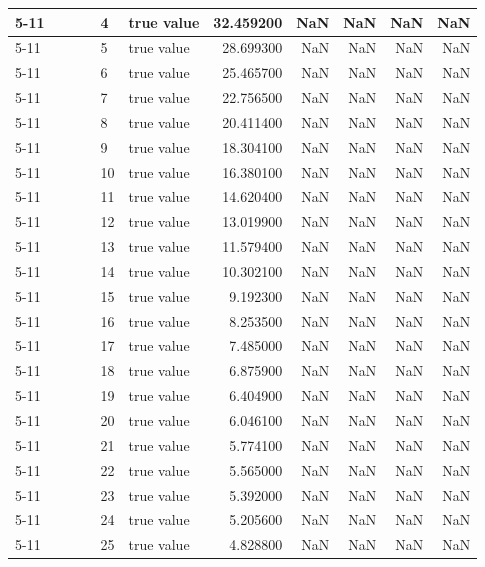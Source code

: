 \begin{tabular}{llllllrrrrr}
\cline{5-11}
 &  &  &  & 4 & true value & 32.459200 & NaN & NaN & NaN & NaN \\
\cline{5-11}
 &  &  &  & 5 & true value & 28.699300 & NaN & NaN & NaN & NaN \\
\cline{5-11}
 &  &  &  & 6 & true value & 25.465700 & NaN & NaN & NaN & NaN \\
\cline{5-11}
 &  &  &  & 7 & true value & 22.756500 & NaN & NaN & NaN & NaN \\
\cline{5-11}
 &  &  &  & 8 & true value & 20.411400 & NaN & NaN & NaN & NaN \\
\cline{5-11}
 &  &  &  & 9 & true value & 18.304100 & NaN & NaN & NaN & NaN \\
\cline{5-11}
 &  &  &  & 10 & true value & 16.380100 & NaN & NaN & NaN & NaN \\
\cline{5-11}
 &  &  &  & 11 & true value & 14.620400 & NaN & NaN & NaN & NaN \\
\cline{5-11}
 &  &  &  & 12 & true value & 13.019900 & NaN & NaN & NaN & NaN \\
\cline{5-11}
 &  &  &  & 13 & true value & 11.579400 & NaN & NaN & NaN & NaN \\
\cline{5-11}
 &  &  &  & 14 & true value & 10.302100 & NaN & NaN & NaN & NaN \\
\cline{5-11}
 &  &  &  & 15 & true value & 9.192300 & NaN & NaN & NaN & NaN \\
\cline{5-11}
 &  &  &  & 16 & true value & 8.253500 & NaN & NaN & NaN & NaN \\
\cline{5-11}
 &  &  &  & 17 & true value & 7.485000 & NaN & NaN & NaN & NaN \\
\cline{5-11}
 &  &  &  & 18 & true value & 6.875900 & NaN & NaN & NaN & NaN \\
\cline{5-11}
 &  &  &  & 19 & true value & 6.404900 & NaN & NaN & NaN & NaN \\
\cline{5-11}
 &  &  &  & 20 & true value & 6.046100 & NaN & NaN & NaN & NaN \\
\cline{5-11}
 &  &  &  & 21 & true value & 5.774100 & NaN & NaN & NaN & NaN \\
\cline{5-11}
 &  &  &  & 22 & true value & 5.565000 & NaN & NaN & NaN & NaN \\
\cline{5-11}
 &  &  &  & 23 & true value & 5.392000 & NaN & NaN & NaN & NaN \\
\cline{5-11}
 &  &  &  & 24 & true value & 5.205600 & NaN & NaN & NaN & NaN \\
\cline{5-11}
 &  &  &  & 25 & true value & 4.828800 & NaN & NaN & NaN & NaN \\

\end{tabular}
